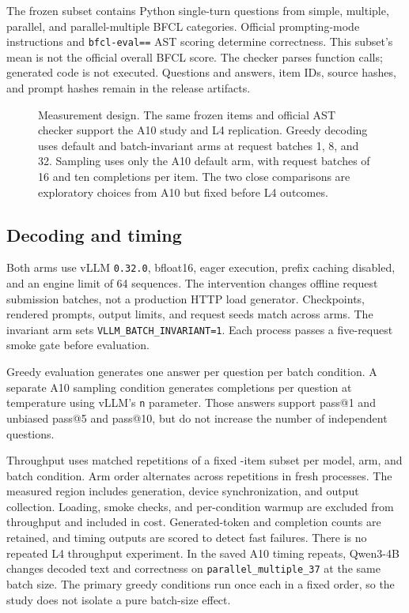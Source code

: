 \documentclass[10pt,twocolumn]{article}
\newcommand{\code}[1]{\texttt{#1}}
\begin{document}
The frozen subset contains \NItems{} Python single-turn questions from simple, multiple, parallel, and parallel-multiple BFCL categories. Official prompting-mode instructions and \code{bfcl-eval==\BFCLVersion} AST scoring determine correctness. This subset's mean is not the official overall BFCL score. The checker parses function calls; generated code is not executed. Questions and answers, item IDs, source hashes, and prompt hashes remain in the release artifacts.

\begin{figure}[t]
\centering

\caption{Measurement design. The same frozen \NItems{} items and official AST checker support the A10 study and L4 replication. Greedy decoding uses default and batch-invariant arms at request batches 1, 8, and 32. Sampling uses only the A10 default arm, with request batches of 16 and ten completions per item. The two close comparisons are exploratory choices from A10 but fixed before L4 outcomes.}
\label{fig:method}
\end{figure}

\subsection{Decoding and timing}
Both arms use vLLM \code{0.32.0}, bfloat16, eager execution, prefix caching disabled, and an engine limit of 64 sequences. The intervention changes offline request submission batches, not a production HTTP load generator. Checkpoints, rendered prompts, output limits, and request seeds match across arms. The invariant arm sets \code{VLLM\_BATCH\_INVARIANT=1}. Each process passes a five-request smoke gate before evaluation.

Greedy evaluation generates one answer per question per batch condition. A separate A10 sampling condition generates \NSamples{} completions per question at temperature \SampleTemperature{} using vLLM's \code{n} parameter. Those answers support pass@1 and unbiased pass@5 and pass@10, but do not increase the number of independent questions.

Throughput uses \TimingRepetitions{} matched repetitions of a fixed \TimingItems{}-item subset per model, arm, and batch condition. Arm order alternates across repetitions in fresh processes. The measured region includes generation, device synchronization, and output collection. Loading, smoke checks, and per-condition warmup are excluded from throughput and included in cost. Generated-token and completion counts are retained, and timing outputs are scored to detect fast failures. There is no repeated L4 throughput experiment. In the saved A10 timing repeats, Qwen3-4B changes decoded text and correctness on \code{parallel\_multiple\_37} at the same batch size. The primary greedy conditions run once each in a fixed order, so the study does not isolate a pure batch-size effect.
\end{document}
